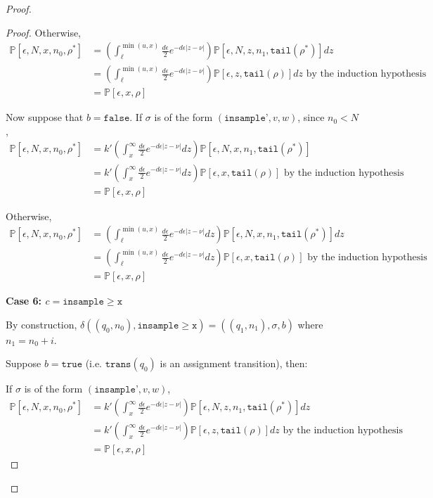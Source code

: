 \documentclass[12pt]{article}
\newcommand{\PP}{\mathbb{P}}
\newcommand{\gguard}{\texttt{insample}\geq \texttt{x}}
\theoremstyle{definition}
\begin{document}
\begin{proof}
\begin{proof}
	
	Otherwise, 
	\begin{align*}
		\PP[\epsilon, N, x, n_0, \rho^*] &= \left(\int_{\ell}^{\min(u, x)}\frac{d\epsilon}{2}e^{-d\epsilon|z-\nu|}\right)\PP[\epsilon, N, z, n_1, \texttt{tail}(\rho^*)]dz \\
		&= \left(\int_{\ell}^{\min(u, x)}\frac{d\epsilon}{2}e^{-d\epsilon|z-\nu|}\right)\PP[\epsilon, z, \texttt{tail}(\rho)]dz \text{ by the induction hypothesis }\\
		&= \PP[\epsilon, x, \rho]
	\end{align*}

	Now suppose that $b = \texttt{false}$. If $\sigma$ is of the form $(\texttt{insample'}, v, w)$, since $n_0 < N$, 
	\begin{align*}
		\PP[\epsilon, N, x, n_0, \rho^*] &= k'\left(\int_x^\infty\frac{d\epsilon}{2}e^{-d\epsilon|z-\nu|}dz\right)\PP[\epsilon, N, x, n_1, \texttt{tail}(\rho^*)]\\
		&= k'\left(\int_x^\infty\frac{d\epsilon}{2}e^{-d\epsilon|z-\nu|}dz\right)\PP[\epsilon, x, \texttt{tail}(\rho)] \text{ by the induction hypothesis }\\
		&= \PP[\epsilon, x, \rho]
	\end{align*}

	Otherwise, 
	\begin{align*}
		\PP[\epsilon, N, x, n_0, \rho^*] &= \left(\int_{\ell}^{\min(u, x)}\frac{d\epsilon}{2}e^{-d\epsilon|z-\nu|}dz\right)\PP[\epsilon, N, x, n_1, \texttt{tail}(\rho^*)]dz \\
		&= \left(\int_{\ell}^{\min(u, x)}\frac{d\epsilon}{2}e^{-d\epsilon|z-\nu|}dz\right)\PP[\epsilon, x, \texttt{tail}(\rho)] \text{ by the induction hypothesis }\\
		&= \PP[\epsilon, x, \rho]
	\end{align*}


	\textbf{Case 6: $c = \gguard$}
	
	By construction, $\delta((q_0, n_0), \gguard) = ((q_1, n_1), \sigma, b)$ where $n_1 = n_0+i$. 

	Suppose $b = \texttt{true}$ (i.e. $\texttt{trans}(q_0)$ is an assignment transition), then:

	If $\sigma$ is of the form $(\texttt{insample'}, v, w)$, 
		\begin{align*}
			\PP[\epsilon, N, x, n_0, \rho^*] &= k'\left(\int_x^\infty\frac{d\epsilon}{2}e^{-d\epsilon|z-\nu|}\right)\PP[\epsilon, N, z, n_1, \texttt{tail}(\rho^*)]dz \\
			&= k'\left(\int_x^\infty\frac{d\epsilon}{2}e^{-d\epsilon|z-\nu|}\right)\PP[\epsilon, z, \texttt{tail}(\rho)]dz \text{ by the induction hypothesis }\\
			&= \PP[\epsilon, x, \rho]
		\end{align*}


\end{proof}
\end{proof}
\end{document}
